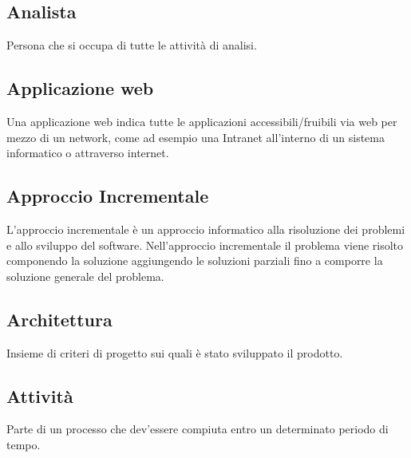 \documentclass[../glossario.tex]{subfiles}
\begin{document}
\subsection*{Analista}
Persona che si occupa di tutte le attività di analisi.

\subsection*{Applicazione web}
Una applicazione web indica tutte le applicazioni accessibili/fruibili via web per mezzo di un network, come ad esempio una Intranet all'interno di un sistema informatico o attraverso internet. 

\subsection*{Approccio Incrementale}
L'approccio incrementale è un approccio informatico alla risoluzione dei problemi e allo sviluppo del software. Nell'approccio incrementale il problema viene risolto componendo la soluzione aggiungendo le soluzioni parziali fino a comporre la soluzione generale del problema.

\subsection*{Architettura}
Insieme di criteri di progetto sui quali è stato sviluppato il prodotto.

\subsection*{Attività}
Parte di un processo che dev'essere compiuta entro un determinato periodo di tempo.
\end{document}
